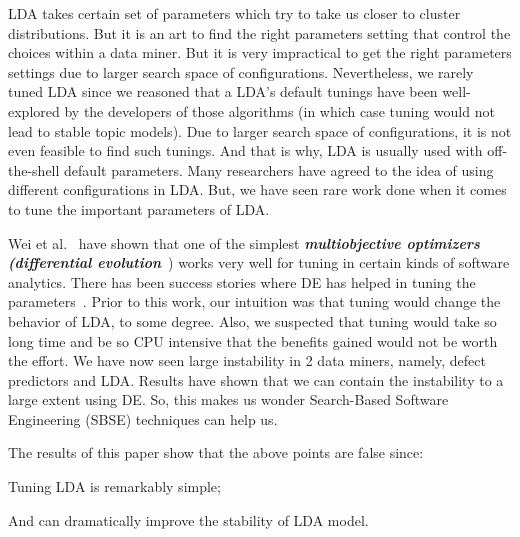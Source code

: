 \documentclass[conference]{IEEEtran}
\theoremstyle{break}
\begin{document}
LDA takes certain set of parameters which try to take us closer to cluster distributions. But it is an art to find the right parameters setting that control the choices within a data miner. But it is very impractical to get the right parameters settings due to larger search space of configurations. Nevertheless, we rarely tuned LDA since we reasoned that a LDA’s default tunings have been well-explored by the developers of those algorithms (in which case tuning would not lead to stable topic models). Due to larger search space of configurations, it is not even feasible to find such tunings. And that is why, LDA is usually used with off-the-shell default parameters. Many researchers have agreed to the idea of using different configurations in LDA. But, we have seen rare work done when it comes to tune the important parameters of LDA.

Wei et al.~\cite{fu2016tuning} have shown that one of the simplest \textit{\textbf{multiobjective optimizers (differential evolution}}~\cite{storn1997differential}) works very well for tuning in certain kinds of software analytics. There has been success stories where DE has helped in tuning the parameters~\cite{bazi2014differential, chiha2012tuning}. Prior to this work, our intuition was that tuning would change the behavior of LDA, to some degree. Also, we suspected that tuning would take so long time and be so CPU intensive that the benefits gained would not be worth the effort. We have now seen large instability in 2 data miners, namely, defect predictors and LDA. Results have shown that we can contain the instability to a large extent using DE. So, this makes us wonder Search-Based Software Engineering (SBSE) techniques can help us.

The results of this paper show that the above points are false since:
\begin{compactitem}
  \item Tuning LDA is remarkably simple;
  \item And can dramatically improve the stability of LDA model.
\end{compactitem}
\end{document}
